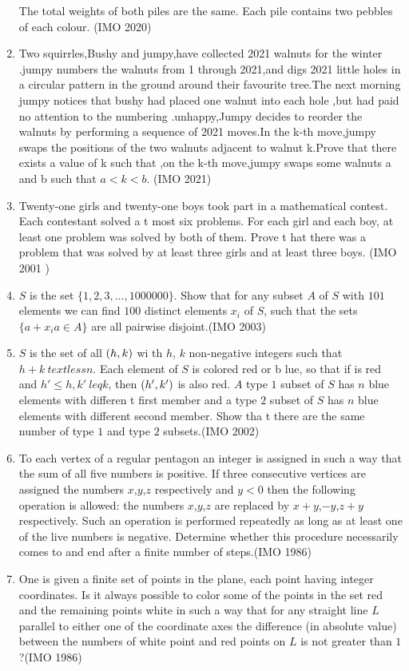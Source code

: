 \begin{enumerate}
    The total weights of both piles are the same.
    Each pile contains two pebbles of each colour.
\hfill(IMO 2020)
\item Two squirrles,Bushy and jumpy,have collected 2021 walnuts for the winter .jumpy  numbers the walnuts from 1 through 2021,and digs 2021 little holes in a circular pattern in the ground around their favourite tree.The next morning jumpy notices that bushy had placed one walnut into each hole ,but had paid no attention to the numbering .unhappy,Jumpy decides to reorder the walnuts by performing a sequence of 2021 moves.In the k-th move,jumpy swaps the positions of the two walnuts adjacent to walnut k.Prove that there exists a value of k such that ,on the k-th move,jumpy swaps some walnuts a and b such that $a< k< b$.
\hfill(IMO 2021)
\item Twenty-one girls and twenty-one boys took part in a mathematical contest. Each contestant solved a t most six problems. For each girl and each boy, at least one problem was solved by both of them. Prove t hat there was a problem that was solved by at least three girls and at least three boys. \hfill(IMO 2001 )
\item $S$ is the set $\{1,2,3,\ldots, 1000000 \}$. Show that for any subset $A$ of $S$ with $101$ elements we can find $100$ distinct elements $x_{i}$ of $S$, such that the sets $\{a+x_{i} a\in A\}$ are all pairwise disjoint.\hfill(IMO 2003)
\item $S$ is the set of all $\left(h, k\right)$ wi th $h$, $k$ non-negative integers such that $h + k \ textless n$. Each element of $S$ is colored red or b lue, so that if  is red and $h'\leq h,k'\ leq k$, then $\left(h', k'\right)$ is also red. $A$ type $ 1$ subset of $S$ has $n$ blue elements with differen t first member and a type $2$ subset of $S$ has $n$ blue elements with different second member. Show tha t there are the same number of type $1$ and type $2$ subsets.\hfill (IMO 2002)
\item  To each vertex of a regular pentagon an integer is assigned in such a way that the sum of all five numbers is positive. If three consecutive vertices are assigned the numbers $x$,$y$,$z$ respectively and $y<0$ then the following operation is allowed: the numbers $x$,$y$,$z$ are replaced by $x+y$,$-y$,$z+y$ respectively. Such an operation is performed repeatedly as long as at least one of the live numbers is negative. Determine whether this procedure necessarily comes to and end after a finite number of steps.\hfill(IMO 1986)
\item One is given a finite set of points in the plane, each point having integer coordinates. Is it always possible to color some of the points in the set red and the remaining points white in such a way that for any straight line $L$ parallel to either one of the coordinate axes the difference (in absolute value) between the numbers of white point and red points on $L$ is not greater than $1$?\hfill(IMO 1986)

\end{enumerate}
